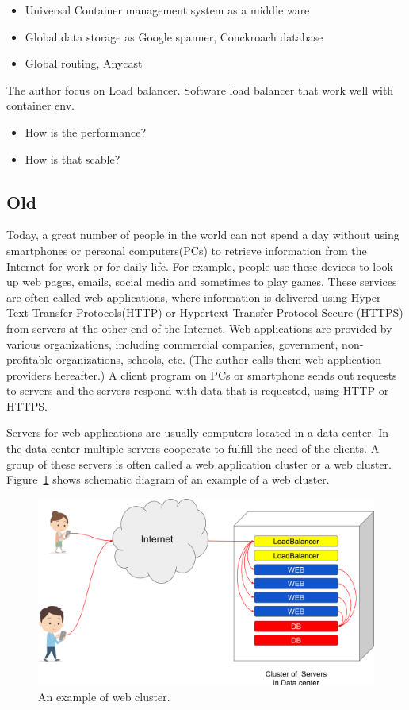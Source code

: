 \begin{itemize}
\item Universal Container management system as a middle ware
\item Global data storage as Google spanner, Conckroach database
\item Global routing, Anycast 
\end{itemize}

The author focus on Load balancer.
Software load balancer that work well with container env.

\begin{itemize}
\item How is the performance?
\item How is that scable?
\end{itemize}

\subsection{Old}

Today, a great number of people in the world can not spend a day without using smartphones or personal computers(PCs) to retrieve information from the Internet for work or for daily life.
For example, people use these devices to look up web pages, emails, social media and sometimes to play games.
These services are often called web applications, where information is delivered using Hyper Text Transfer Protocols(HTTP) or Hypertext Transfer Protocol Secure (HTTPS) from servers at the other end of the Internet.
Web applications are provided by various organizations, including commercial companies, government, non-profitable organizations, schools, etc.
(The author calls them web application providers hereafter.)
A client program on PCs or smartphone sends out requests to servers and the servers respond with data that is requested, using HTTP or HTTPS. 

Servers for web applications are usually computers located in a data center.
In the data center multiple servers cooperate to fulfill the need of the clients.
A group of these servers is often called a web application cluster or a web cluster.
Figure~\ref{fig:web_cluster} shows schematic diagram of an example of a web cluster.

\begin{figure}[h]
\begin{center}
\includegraphics[width=0.8\columnwidth]{Figs/web_cluster.png}
\end{center}
\caption{
An example of web cluster.
}
\label{fig:web_cluster}
\end{figure}


